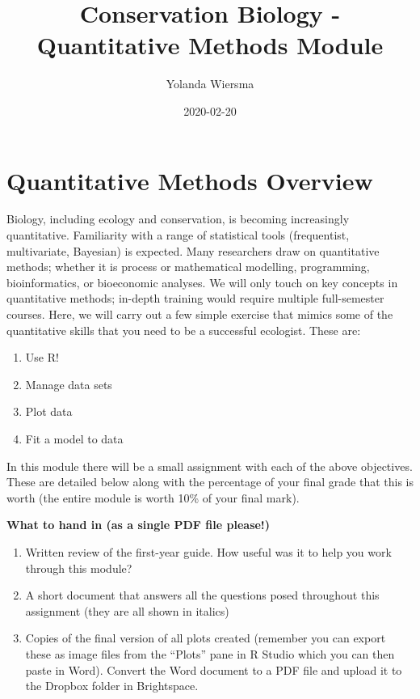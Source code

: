 \documentclass[]{book}
\title{Conservation Biology - Quantitative Methods Module}
\author{Yolanda Wiersma}
\date{2020-02-20}
\providecommand{\tightlist}{%
  \setlength{\itemsep}{0pt}\setlength{\parskip}{0pt}}
\begin{document}
\maketitle

{
\setcounter{tocdepth}{1}
\tableofcontents
}
\hypertarget{quantitative-methods-overview}{%
\chapter{Quantitative Methods Overview}\label{quantitative-methods-overview}}

Biology, including ecology and conservation, is becoming increasingly quantitative. Familiarity with a range of statistical tools (frequentist, multivariate, Bayesian) is expected. Many researchers draw on quantitative methods; whether it is process or mathematical modelling, programming, bioinformatics, or bioeconomic analyses. We will only touch on key concepts in quantitative methods; in-depth training would require multiple full-semester courses. Here, we will carry out a few simple exercise that mimics some of the quantitative skills that you need to be a successful ecologist. These are:

\begin{enumerate}
\def\labelenumi{\arabic{enumi}.}
\tightlist
\item
  Use R!
\item
  Manage data sets
\item
  Plot data
\item
  Fit a model to data
\end{enumerate}

In this module there will be a small assignment with each of the above objectives. These are detailed below along with the percentage of your final grade that this is worth (the entire module is worth 10\% of your final mark).

\textbf{What to hand in (as a single PDF file please!)}

\begin{enumerate}
\def\labelenumi{\arabic{enumi}.}
\item
  Written review of the first-year guide. How useful was it to help you work through this module?
\item
  A short document that answers all the questions posed throughout this assignment (they are all shown in italics)
\item
  Copies of the final version of all plots created (remember you can export these as image files from the ``Plots'' pane in R Studio which you can then paste in Word). Convert the Word document to a PDF file and upload it to the Dropbox folder in Brightspace.
\end{enumerate}
\end{document}
